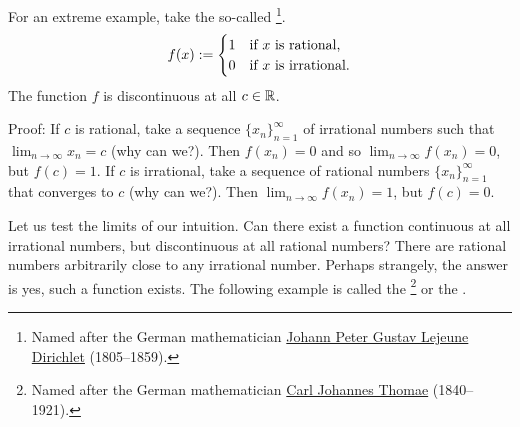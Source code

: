 \begin{example}
For an extreme example, take the so-called
\emph{}\footnote{Named after the German
mathematician
\href{https://en.wikipedia.org/wiki/Peter_Gustav_Lejeune_Dirichlet}{Johann Peter Gustav Lejeune
Dirichlet}
(1805--1859).}.
\begin{equation*}
f(x) :=
\begin{cases}
1 & \text{if } x \text{ is rational,} \\
0 & \text{if } x \text{ is irrational.}
\end{cases}
\avoidbreak
\end{equation*}
The function $f$ is discontinuous at all $c \in {\mathbb{R}}$.

Proof:
If $c$ is rational, take a sequence $\{ x_n \}_{n=1}^\infty$
of irrational numbers such that $\lim_{n\to\infty} x_n = c$ (why can we?).  Then $f(x_n) = 0$
and so $\lim_{n\to\infty} f(x_n) = 0$, but $f(c) = 1$.
If $c$ is irrational, take a sequence of rational numbers
$\{ x_n \}_{n=1}^\infty$
that converges to $c$ (why can we?).  Then $\lim_{n\to\infty} f(x_n) = 1$, but $f(c) = 0$.
\end{example}

Let us test the limits of our intuition.  Can
there exist a function continuous at all irrational numbers, but
discontinuous at all rational numbers?  There are rational numbers
arbitrarily close to any irrational number.  Perhaps strangely, the
answer is yes, such a function exists.  The following example is called the
\emph{}\footnote{Named after the German
mathematician
\href{https://en.wikipedia.org/wiki/Carl_Johannes_Thomae}{Carl Johannes Thomae}
(1840--1921).} or the
\emph{}.


